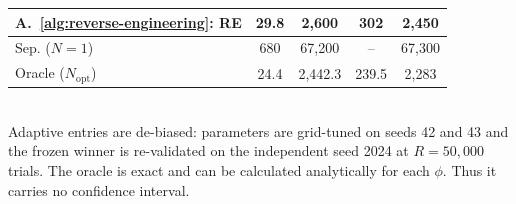\begin{table}[ht]
\begin{tabular}{l c c c c}
A.~\ref{alg:reverse-engineering}: RE
& 29.8 \newline {\scriptsize [29.2, 30.3]}
& 2{,}600 \newline {\scriptsize [2{,}570, 2{,}630]}
& 302 \newline {\scriptsize [298, 307]}
& 2{,}450 \newline {\scriptsize [2{,}420, 2{,}480]} \\
\midrule
Sep. ($N=1$)
& 680 \newline {\scriptsize [669, 691]}
& 67{,}200 \newline {\scriptsize [66{,}300, 68{,}300]}
& --
& 67{,}300 \newline {\scriptsize [66{,}300, 68{,}500]} \\
\midrule
Oracle ($N_\text{opt}$)
& 24.4
& 2{,}442.3
& 239.5
& 2{,}283 \\
\bottomrule
\end{tabular}
\\[2pt]
\footnotesize Adaptive entries are de-biased: parameters are grid-tuned on seeds 42 and 43 and the frozen winner is re-validated on the independent seed 2024 at $R=50{,}000$ trials. The oracle is exact and can be calculated analytically for each $\phi$. Thus it carries no confidence interval.
\end{table}

